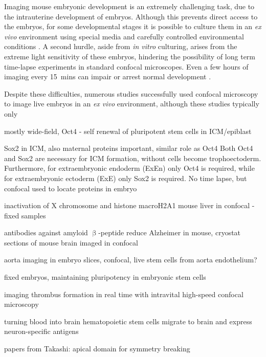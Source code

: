 Imaging mouse embryonic development is an extremely challenging task, due to the intrauterine development of embryos. Although this prevents direct access to the embryos, for some developmental stages it is possible to culture them in an \textit{ex vivo} environment using special media and carefully controlled environmental conditions \cite{garcia_live_2011,doherty_culture_2000}. A second hurdle, aside from \textit{in vitro} culturing, arises from the extreme light sensitivity \cite{nowotschin_chapter_2010} of these embryos, hindering the possibility of long term time-lapse experiments in standard confocal microscopes. Even a few hours of imaging every \SI{15}{mins} can impair or arrest normal development \cite{strnad_inverted_2016}.

Despite these difficulties, numerous studies successfully used confocal microscopy to image live embryos in an \textit{ex vivo} environment, although these studies typically only 

mostly wide-field, Oct4 - self renewal of pluripotent stem cells in ICM/epiblast \cite{nichols_formation_1998}

Sox2 in ICM, also maternal proteins important, similar role as Oct4 Both Oct4 and Sox2 are necessary for ICM formation, without cells become trophoectoderm. Furthermore, for extraembryonic endoderm (ExEn) only Oct4 is required, while for extraembryonic ectoderm (ExE) only Sox2 is required. No time lapse, but confocal used to locate proteins in embryo \cite{avilion_multipotent_2003}

inactivation of X chromosome and histone macroH2A1
mouse liver in confocal - fixed samples \cite{costanzi_histone_1998}

antibodies against amyloid $\upbeta$-peptide reduce Alzheimer in mouse, cryostat sections of mouse brain imaged in confocal\cite{bard_peripherally_2000}


aorta imaging in embryo slices, confocal, live stem cells from aorta endothelium? \cite{boisset_vivo_2010}

fixed embryos, maintaining pluripotency in embryonic stem cells\cite{sato_maintenance_2004}

imaging thrombus formation in real time with intravital high-speed confocal microscopy\cite{falati_real-time_2002}

turning blood into brain hematopoietic stem cells migrate to brain and express neuron-specific antigens \cite{mezey_turning_2000}

papers from Takashi:
apical domain for symmetry breaking \cite{korotkevich_apical_2017}

